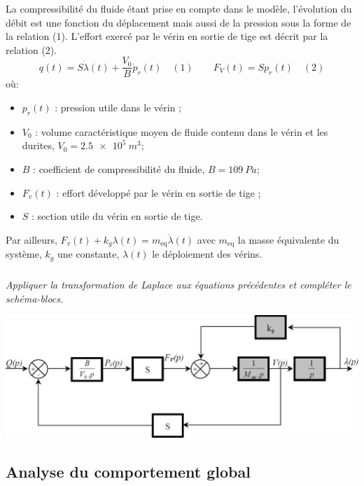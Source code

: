 \begin{multicols}{2}
\begin{multicols}{2}
La compressibilité du fluide étant prise en compte dans le modèle, l'évolution du débit est une fonction du déplacement mais aussi de la pression sous la forme de la relation (1). L'effort exercé par le vérin en sortie de tige est décrit par la relation (2).
$$
q(t)=S\dot{\lambda}(t)+\dfrac{V_0}{B}\dot{p}_r(t) \quad (1) \quad\quad
F_V(t)=Sp_r(t) \quad (2)
$$
où:
\begin{itemize}
\item $p_r(t)$ : pression utile dans le vérin ;
\item $V_0$ : volume caractéristique moyen de fluide contenu dans le vérin et les durites, $V_0 = \SI{2,5e5}{m^3}$;
\item $B$ : coefficient de compressibilité du fluide, $B = \SI{109}{Pa}$;
\item $F_v(t)$ : effort développé par le vérin en sortie de tige ;
\item $S$ : section utile du vérin en sortie de tige.
\end{itemize}

Par ailleurs, $F_v(t)+k_g \lambda(t)=m_{\text{eq}}\ddot{\lambda}(t)$ avec $m_{\text{eq}}$ la masse équivalente du système, $k_g$ une constante, $\lambda(t)$ le déploiement des vérins.



\subparagraph{}\textit{Appliquer la transformation de Laplace aux équations précédentes et compléter le schéma-blocs.}
\ifprof
\begin{corrige}
\begin{center}
\includegraphics[width=.95\linewidth]{images/cor_04}
\end{center}    
\end{corrige}
\else
\fi


\subsection*{Analyse du comportement global}



\end{multicols}
\end{multicols}
